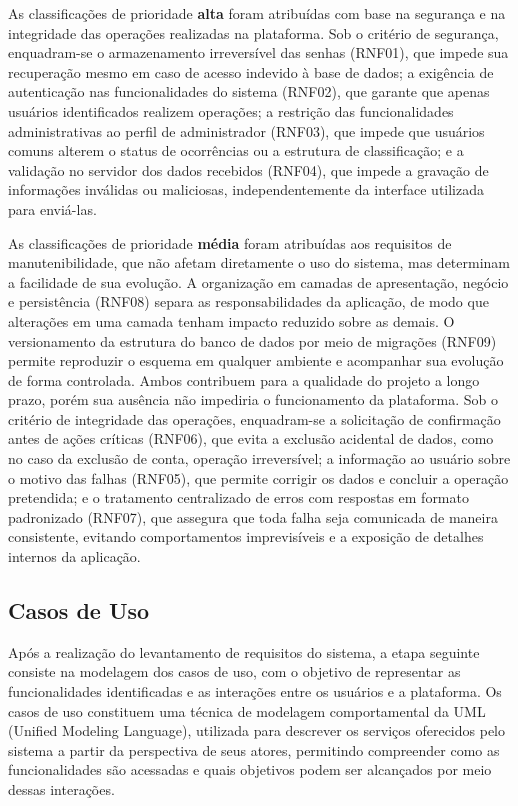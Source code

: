 \documentclass[12pt,a4paper]{article}
\begin{document}
As classificações de prioridade \textbf{alta} foram atribuídas com base na segurança e na integridade das operações realizadas na plataforma. Sob o critério de segurança, enquadram-se o armazenamento irreversível das senhas (RNF01), que impede sua recuperação mesmo em caso de acesso indevido à base de dados; a exigência de autenticação nas funcionalidades do sistema (RNF02), que garante que apenas usuários identificados realizem operações; a restrição das funcionalidades administrativas ao perfil de administrador (RNF03), que impede que usuários comuns alterem o status de ocorrências ou a estrutura de classificação; e a validação no servidor dos dados recebidos (RNF04), que impede a gravação de informações inválidas ou maliciosas, independentemente da interface utilizada para enviá-las. 

As classificações de prioridade \textbf{média} foram atribuídas aos requisitos de manutenibilidade, que não afetam diretamente o uso do sistema, mas determinam a facilidade de sua evolução. A organização em camadas de apresentação, negócio e persistência (RNF08) separa as responsabilidades da aplicação, de modo que alterações em uma camada tenham impacto reduzido sobre as demais. O versionamento da estrutura do banco de dados por meio de migrações (RNF09) permite reproduzir o esquema em qualquer ambiente e acompanhar sua evolução de forma controlada. Ambos contribuem para a qualidade do projeto a longo prazo, porém sua ausência não impediria o funcionamento da plataforma. Sob o critério de integridade das operações, enquadram-se a solicitação de confirmação antes de ações críticas (RNF06), que evita a exclusão acidental de dados, como no caso da exclusão de conta, operação irreversível; a informação ao usuário sobre o motivo das falhas (RNF05), que permite corrigir os dados e concluir a operação pretendida; e o tratamento centralizado de erros com respostas em formato padronizado (RNF07), que assegura que toda falha seja comunicada de maneira consistente, evitando comportamentos imprevisíveis e a exposição de detalhes internos da aplicação.





\subsection{Casos de Uso}
Após a realização do levantamento de requisitos do sistema, a etapa seguinte consiste na modelagem dos casos de uso, com o objetivo de representar as funcionalidades identificadas e as interações entre os usuários e a plataforma. Os casos de uso constituem uma técnica de modelagem comportamental da UML (Unified Modeling Language), utilizada para descrever os serviços oferecidos pelo sistema a partir da perspectiva de seus atores, permitindo compreender como as funcionalidades são acessadas e quais objetivos podem ser alcançados por meio dessas interações.
\end{document}
